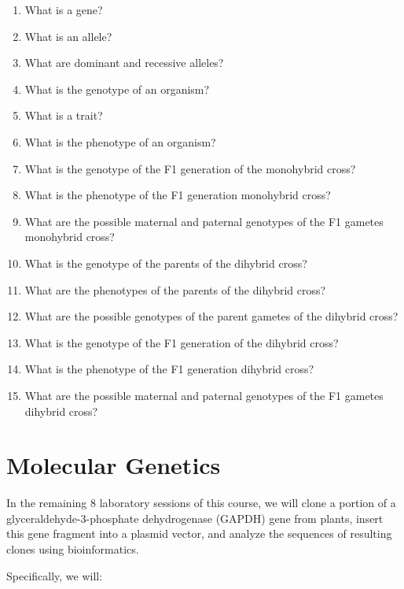 \documentclass[]{book}
\providecommand{\tightlist}{%
  \setlength{\itemsep}{0pt}\setlength{\parskip}{0pt}}
\theoremstyle{definition}
\theoremstyle{definition}
\theoremstyle{definition}
\theoremstyle{remark}
\begin{document}
\begin{enumerate}
\def\labelenumi{\arabic{enumi}.}
\tightlist
\item
  What is a gene?
\item
  What is an allele?
\item
  What are dominant and recessive alleles?
\item
  What is the genotype of an organism?
\item
  What is a trait?
\item
  What is the phenotype of an organism?
\item
  What is the genotype of the F1 generation of the monohybrid cross?
\item
  What is the phenotype of the F1 generation monohybrid cross?
\item
  What are the possible maternal and paternal genotypes of the F1
  gametes monohybrid cross?
\item
  What is the genotype of the parents of the dihybrid cross?
\item
  What are the phenotypes of the parents of the dihybrid cross?
\item
  What are the possible genotypes of the parent gametes of the dihybrid
  cross?
\item
  What is the genotype of the F1 generation of the dihybrid cross?
\item
  What is the phenotype of the F1 generation dihybrid cross?
\item
  What are the possible maternal and paternal genotypes of the F1
  gametes dihybrid cross?
\end{enumerate}

\chapter*{Molecular Genetics}\label{molecular-genetics}

In the remaining 8 laboratory sessions of this course, we will clone a
portion of a glyceraldehyde-3-phosphate dehydrogenase (GAPDH) gene from
plants, insert this gene fragment into a plasmid vector, and analyze the
sequences of resulting clones using bioinformatics.

Specifically, we will:
\end{document}

